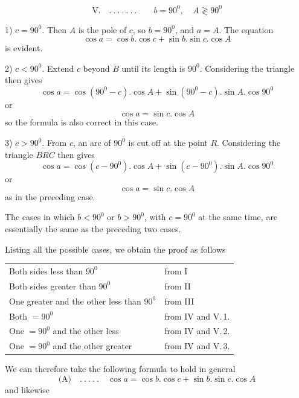 %
\[
\text{V.}\quad .\ .\ .\ .\ .\ .\ .\qquad b=90^0,\quad A\gtrless90^0
\]
\par
1) \(c=90^0\). Then \(A\) is the pole of \(c\), so \(b=90^0\), and \(a=A\). The equation
\[
\cos a=\cos b.\cos c+\sin b.\sin c.\cos A
\]
is evident.

2) \(c<90^0\). Extend \(c\) beyond \(B\) until its length is \(90^0\). Considering the triangle then gives
\[
\cos a=\cos(90^0-c).\cos A+\sin(90^0-c).\sin A.\cos90^0
\]
or
\[
\cos a=\sin c.\cos A
\]
so the formula is also correct in this case.

3) \(c>90^0\). From \(c\), an arc of \(90^0\) is cut off at the point \(R\). Considering the triangle \(BRC\) then gives
\[
\cos a=\cos(c-90^0).\cos A+\sin(c-90^0).\sin A.\cos90^0
\]
or
\[
\cos a=\sin c.\cos A
\]
as in the preceding case.

The cases in which \(b<90^0\) or \(b>90^0\), with \(c=90^0\) at the same time, are essentially the same as the preceding two cases.

Listing all the possible cases, we obtain the proof as follows
\begin{center}
\begin{tabular}{ll}
Both sides less than \(90^0\)&from I\\
Both sides greater than \(90^0\)&from II\\
One greater and the other less than \(90^0\)&from III\\
Both \(=90^0\)&from IV and V.\,1.\\
One \(=90^0\) and the other less&from IV and V.\,2.\\
One \(=90^0\) and the other greater&from IV and V.\,3.\\
\end{tabular}
\end{center}
\hspace*{\parindent}We can therefore take the following formula to hold in general
\[
\text{(A)}\quad .\ .\ .\ .\ .\quad\cos a=\cos b.\cos c+\sin b.\sin c.\cos A
\]
and likewise
